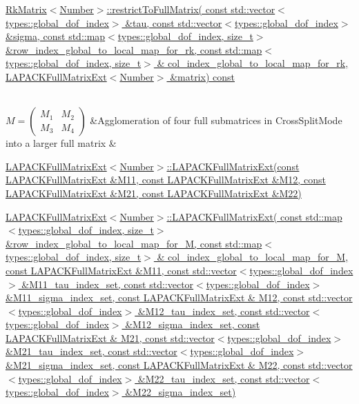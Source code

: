 \begin{longtabu}
\begin{DoxyItemize}
\item \hyperlink{classRkMatrix_a0c529b22a8a38c4046a93c4a16ad39ca}{Rk\+Matrix$<$\+Number$>$\+::restrict\+To\+Full\+Matrix( const std\+::vector$<$types\+::global\+\_\+dof\+\_\+index$>$ \&tau, const std\+::vector$<$types\+::global\+\_\+dof\+\_\+index$>$ \&sigma, const std\+::map$<$types\+::global\+\_\+dof\+\_\+index, size\+\_\+t$>$ \&row\+\_\+index\+\_\+global\+\_\+to\+\_\+local\+\_\+map\+\_\+for\+\_\+rk, const std\+::map$<$types\+::global\+\_\+dof\+\_\+index, size\+\_\+t$>$ \& col\+\_\+index\+\_\+global\+\_\+to\+\_\+local\+\_\+map\+\_\+for\+\_\+rk, L\+A\+P\+A\+C\+K\+Full\+Matrix\+Ext$<$\+Number$>$ \&matrix) const}
\end{DoxyItemize}\\
$M = \begin{pmatrix} M_1 & M_2 \\ M_3 & M_4 \end{pmatrix}$ &Agglomeration of four full submatrices in {\ttfamily Cross\+Split\+Mode} into a larger full matrix &
\begin{DoxyItemize}
\item \hyperlink{classLAPACKFullMatrixExt_aa94c466249d0df9e122443c0b6263cf3}{L\+A\+P\+A\+C\+K\+Full\+Matrix\+Ext$<$\+Number$>$\+::\+L\+A\+P\+A\+C\+K\+Full\+Matrix\+Ext(const L\+A\+P\+A\+C\+K\+Full\+Matrix\+Ext \&\+M11, const L\+A\+P\+A\+C\+K\+Full\+Matrix\+Ext \&\+M12, const L\+A\+P\+A\+C\+K\+Full\+Matrix\+Ext \&\+M21, const L\+A\+P\+A\+C\+K\+Full\+Matrix\+Ext \&\+M22)}
\item \hyperlink{classLAPACKFullMatrixExt_a4baa5d6642259df28cf9f32cb6b71a25}{L\+A\+P\+A\+C\+K\+Full\+Matrix\+Ext$<$\+Number$>$\+::\+L\+A\+P\+A\+C\+K\+Full\+Matrix\+Ext( const std\+::map$<$types\+::global\+\_\+dof\+\_\+index, size\+\_\+t$>$ \&row\+\_\+index\+\_\+global\+\_\+to\+\_\+local\+\_\+map\+\_\+for\+\_\+\+M, const std\+::map$<$types\+::global\+\_\+dof\+\_\+index, size\+\_\+t$>$ \& col\+\_\+index\+\_\+global\+\_\+to\+\_\+local\+\_\+map\+\_\+for\+\_\+\+M, const L\+A\+P\+A\+C\+K\+Full\+Matrix\+Ext \&\+M11, const std\+::vector$<$types\+::global\+\_\+dof\+\_\+index$>$ \&\+M11\+\_\+tau\+\_\+index\+\_\+set, const std\+::vector$<$types\+::global\+\_\+dof\+\_\+index$>$ \&\+M11\+\_\+sigma\+\_\+index\+\_\+set, const L\+A\+P\+A\+C\+K\+Full\+Matrix\+Ext \& M12, const std\+::vector$<$types\+::global\+\_\+dof\+\_\+index$>$ \&\+M12\+\_\+tau\+\_\+index\+\_\+set, const std\+::vector$<$types\+::global\+\_\+dof\+\_\+index$>$ \&\+M12\+\_\+sigma\+\_\+index\+\_\+set, const L\+A\+P\+A\+C\+K\+Full\+Matrix\+Ext \& M21, const std\+::vector$<$types\+::global\+\_\+dof\+\_\+index$>$ \&\+M21\+\_\+tau\+\_\+index\+\_\+set, const std\+::vector$<$types\+::global\+\_\+dof\+\_\+index$>$ \&\+M21\+\_\+sigma\+\_\+index\+\_\+set, const L\+A\+P\+A\+C\+K\+Full\+Matrix\+Ext \& M22, const std\+::vector$<$types\+::global\+\_\+dof\+\_\+index$>$ \&\+M22\+\_\+tau\+\_\+index\+\_\+set, const std\+::vector$<$types\+::global\+\_\+dof\+\_\+index$>$ \&\+M22\+\_\+sigma\+\_\+index\+\_\+set)}

\end{DoxyItemize}
\end{longtabu}

